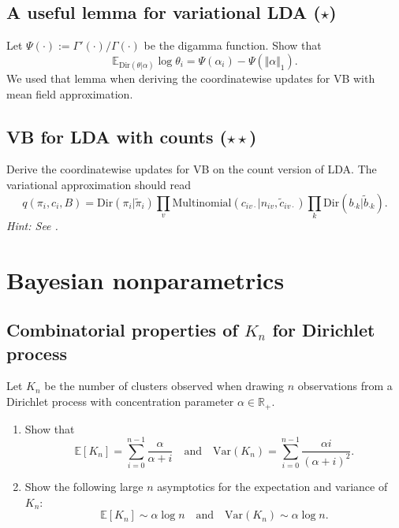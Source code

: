 \documentclass{article}
\newif\ifsolutions
\newcommand\solution[1]{
\ifsolutions
\begin{mdframed}[style=MyFrame]
\textcolor{bleu}{\textbf{Solution:} #1}
\end{mdframed}
\fi
}
\begin{document}
\subsection{A useful lemma for variational LDA ($\star$)}
Let $\Psi(\cdot) := \Gamma'(\cdot)/\Gamma(\cdot)$ be the digamma function. Show that
$$
\mathbb{E}_{\text{Dir}(\theta\vert\alpha)} \log \theta_i = \Psi(\alpha_i) - \Psi(\Vert \alpha\Vert_1).
$$
We used that lemma when deriving the coordinatewise updates for VB with mean field approximation.

\subsection{VB for LDA with counts ($\star\star$)}
Derive the coordinatewise updates for VB on the count version of LDA. The variational approximation should read
$$
q(\pi_i, c_i, B) = \text{Dir}(\pi_i\vert\tilde\pi_i) \prod_v \text{Multinomial}(c_{iv\cdot}\vert n_{iv}, \tilde{c}_{iv\cdot}) \prod_k \text{Dir}(b_{\cdot k}\vert\tilde b_{\cdot k}).
$$
\emph{Hint: See \cite[Section 27.3.6]{Mur12}.}

 \section{Bayesian nonparametrics}
 \subsection{Combinatorial properties of $K_n$ for Dirichlet process}
 \label{ex:K_n-DP}
 Let $K_n$ be the number of clusters observed when drawing $n$ observations from a Dirichlet process with concentration parameter $\alpha\in\mathbb{R}_+$.
 \begin{enumerate}
 	\item Show that
 \begin{equation*}
     \mathbb{E}[K_{n}] = \sum_{i=0}^{n-1} \frac{\alpha}{\alpha + i} \quad \text{and} \quad \mbox{Var}(K_n) = \sum_{i=0}^{n-1} \frac{\alpha i}{(\alpha + i)^2}.
 \end{equation*}
 	\item Show the following large $n$ asymptotics for the expectation and variance of $K_n$:
 \begin{equation*}
         \mathbb{E}[K_n] \sim \alpha\log n  \quad \text{and} \quad \mbox{Var}(K_n)\sim \alpha\log n.
 \end{equation*}
 \end{enumerate}
 
 \solution{
\begin{enumerate}
	\item The expressions are obtained by writing $K_n$ as a sum of independent Bernoulli random variables of parameter $\frac{\alpha}{\alpha+i}$, for $i=0,\ldots, n-1$, due to the DP predictive distribution.
	\item This is obtained by factorizing by $\alpha$ and by Riemann sums of the intergal of $x\mapsto 1/x$ over interval $[1,n]$.
\end{enumerate}
}
 
\end{document}
